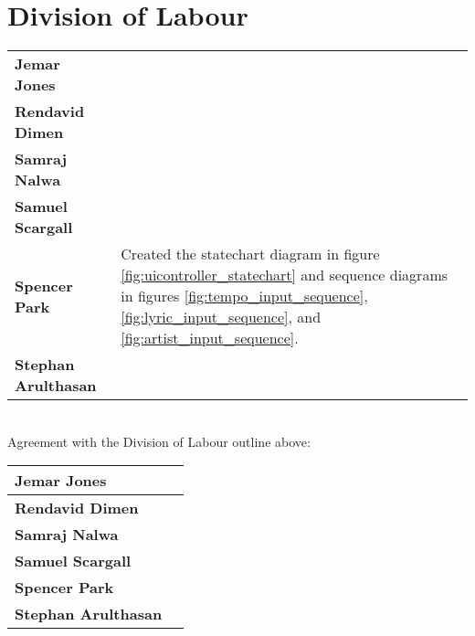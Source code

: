 \documentclass[]{article}
\begin{document}
\appendix
\newpage
\section{Division of Labour}
\label{sec:division_of_labour}
\noindent\begin{tabular}{l l}
	\textbf{Jemar Jones} & \\
	\textbf{Rendavid Dimen} & \\
	\textbf{Samraj Nalwa} & \\
	\textbf{Samuel Scargall} & \\
	\textbf{Spencer Park} & Created the statechart diagram in figure \ref{fig:uicontroller_statechart} and sequence diagrams in figures \ref{fig:tempo_input_sequence}, \ref{fig:lyric_input_sequence}, and \ref{fig:artist_input_sequence}.\\
	\textbf{Stephan Arulthasan} & \\
\end{tabular}
\\

\noindent Agreement with the Division of Labour outline above:

\noindent\begin{tabularx}{\linewidth}{|l|X|}
	\hline
	\rule{0pt}{2em} \textbf{Jemar Jones} & \\
	\hline
	\rule{0pt}{2em} \textbf{Rendavid Dimen} & \\
	\hline
	\rule{0pt}{2em} \textbf{Samraj Nalwa} & \\
	\hline
	\rule{0pt}{2em} \textbf{Samuel Scargall} & \\
	\hline
	\rule{0pt}{2em} \textbf{Spencer Park} & \\
	\hline
	\rule{0pt}{2em} \textbf{Stephan Arulthasan} & \\
	\hline
\end{tabularx}

\newpage
\end{document}
